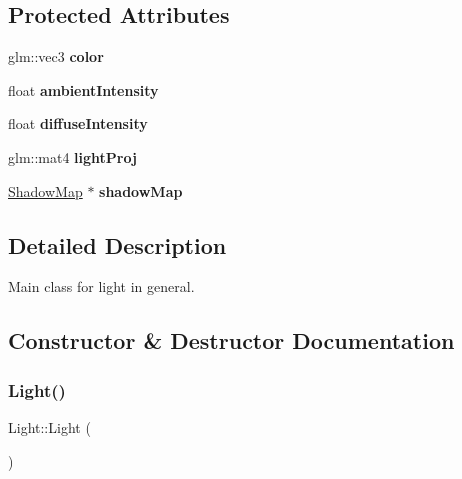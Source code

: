 \subsection*{Protected Attributes}
\begin{DoxyCompactItemize}
\item 
\mbox{\label{class_light_a91d73d70b4bd4beb402c0f16dab19a25}} 
glm\+::vec3 {\bfseries color}
\item 
\mbox{\label{class_light_ad9cce6049bcc2dd7d79e055bb2a82287}} 
float {\bfseries ambient\+Intensity}
\item 
\mbox{\label{class_light_adadbfaef7ca1dbfd06b2594fdf05a8b0}} 
float {\bfseries diffuse\+Intensity}
\item 
\mbox{\label{class_light_a274e0f9992d7ec30f049c011a21bd2ca}} 
glm\+::mat4 {\bfseries light\+Proj}
\item 
\mbox{\label{class_light_a3807d64d783bfafaa33ac52beef26e77}} 
\mbox{\hyperlink{class_shadow_map}{Shadow\+Map}} $\ast$ {\bfseries shadow\+Map}
\end{DoxyCompactItemize}


\subsection{Detailed Description}
Main class for light in general. 

\subsection{Constructor \& Destructor Documentation}
\mbox{\label{class_light_aeb5df09a25a32f19fdffa761268ba24f}} 
\subsubsection{\texorpdfstring{Light()}{Light()}\hspace{0.1cm}{\footnotesize\ttfamily [1/2]}}
{\footnotesize\ttfamily Light\+::\+Light (\begin{DoxyParamCaption}{ }\end{DoxyParamCaption})}

